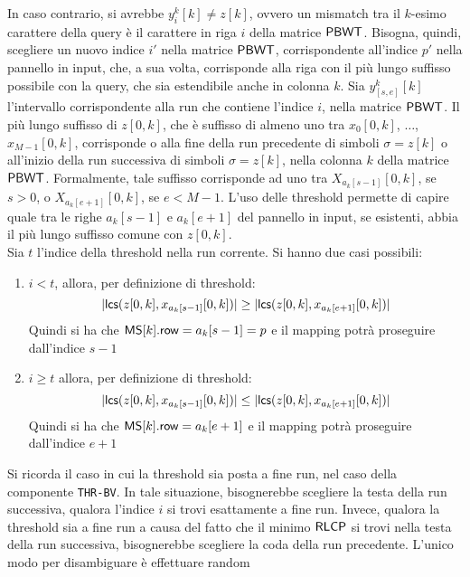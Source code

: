 In caso contrario, si avrebbe 
$y_i^k[k]\neq z[k]$, ovvero un mismatch tra il $k$-esimo carattere
della query è il carattere in riga $i$ della matrice $\mbox{\rm {\sf PBWT}}$. Bisogna,
quindi, scegliere un nuovo indice $i'$ nella matrice $\mbox{\rm {\sf PBWT}}$,
corrispondente all'indice $p'$ nella pannello in input, che, a sua volta,
corrisponde alla riga 
con il più lungo suffisso possibile con la query, che sia estendibile anche in
colonna $k$. Sia $y_{[s,e]}^k[k]$ l'intervallo corrispondente alla run che
contiene l'indice $i$, nella matrice $\mbox{\rm {\sf PBWT}}$. Il più lungo suffisso
di $z[0,k]$, che è suffisso di almeno uno tra $x_0[0,k]$, $\ldots$,
$x_{M-1}[0,k]$, corrisponde o alla fine della run precedente di simboli
$\sigma=z[k]$ o all'inizio della run successiva di simboli
$\sigma=z[k]$, nella colonna $k$ della matrice $\mbox{\rm {\sf PBWT}}$. Formalmente,
tale suffisso corrisponde ad uno tra $X_{a_k[s-1]}[0,k]$, se $s>0$, o
$X_{a_k[e+1]}[0,k]$, se 
$e<M-1$. L'uso delle threshold permette di capire quale tra le righe $a_k[s-1]$
e $a_k[e+1]$ del pannello in input, se esistenti, abbia il più lungo suffisso
comune con $z[0,k]$. \\
Sia $t$ l'indice della threshold nella run corrente. Si hanno due casi
possibili:
\begin{enumerate}
  \item $i<t$, allora, per definizione di threshold:
  \begin{equation}
    \label{eq:thrra2}
    |\mbox{\rm {\sf lcs}}(z[0,k], x_{a_{k}[s-1]}[0,k])|\geq |\mbox{\rm {\sf lcs}}(z[0,k], x_{a_{k}[e+1]}[0,k])|
  \end{equation}
  Quindi si ha che $\mbox{\rm {\sf MS}}[k].\mbox{\rm {\sf row}}=a_{k}[s-1]=p$ e il mapping potrà proseguire
  dall'indice $s-1$
  \item  $i\geq t$ allora, per definizione di threshold:
  \begin{equation}
    \label{eq:thrra1}
    |\mbox{\rm {\sf lcs}}(z[0,k], x_{a_{k}[s-1]}[0,k])|\leq |\mbox{\rm {\sf lcs}}(z[0,k], x_{a_{k}[e+1]}[0,k])|
  \end{equation}
  Quindi si ha che $\mbox{\rm {\sf MS}}[k].\mbox{\rm {\sf row}}=a_{k}[e+1]$ e il mapping potrà proseguire
  dall'indice $e+1$
\end{enumerate}
Si ricorda il caso in cui la threshold sia posta a fine run, nel caso
della componente \texttt{THR-BV}. In tale situazione, bisognerebbe scegliere la
testa della run successiva, qualora l'indice $i$ 
si trovi esattamente a fine run. Invece, qualora la
threshold sia a fine run a causa del fatto che il minimo $\mbox{\rm {\sf RLCP}}$
si trovi nella testa della run successiva, bisognerebbe scegliere la coda della
run 
precedente. L'unico modo per disambiguare è effettuare random

